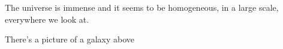\documentclass{article}
\begin{document}
\begin{landscape}
The universe is immense and it seems to be homogeneous, 
in a large scale, everywhere we look at.


There's a picture of a galaxy above

\end{landscape}
\end{document}
